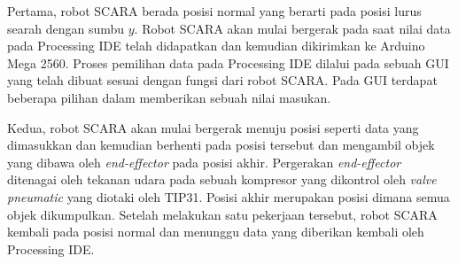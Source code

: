 Pertama, robot SCARA berada posisi normal yang berarti pada posisi lurus searah dengan sumbu $y$. Robot SCARA akan mulai bergerak pada saat nilai data pada Processing IDE telah didapatkan dan kemudian dikirimkan ke Arduino Mega 2560. Proses pemilihan data pada Processing IDE dilalui pada sebuah GUI yang telah dibuat sesuai dengan fungsi dari robot SCARA. Pada GUI terdapat beberapa pilihan dalam memberikan sebuah nilai masukan. 

Kedua, robot SCARA akan mulai bergerak menuju posisi seperti data yang dimasukkan dan kemudian berhenti pada posisi tersebut dan mengambil objek yang dibawa oleh \textit{end-effector} pada posisi akhir.  Pergerakan \textit{end-effector} ditenagai oleh tekanan udara pada sebuah kompresor yang dikontrol oleh\textit{ valve pneumatic} yang diotaki oleh TIP31. Posisi akhir merupakan posisi dimana semua objek dikumpulkan. Setelah melakukan satu pekerjaan tersebut, robot SCARA kembali pada posisi normal dan menunggu data yang diberikan kembali oleh Processing IDE.  




